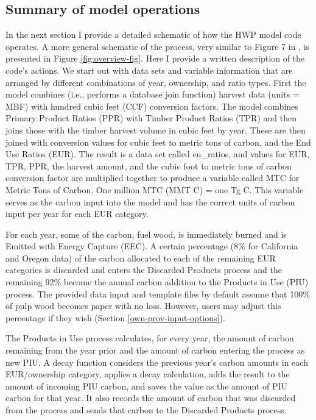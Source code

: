 \documentclass[
  openany]{book}
\begin{document}
\hypertarget{model-func-opp}{%
\subsection{Summary of model operations}\label{model-func-opp}}

In the next section I provide a detailed schematic of how the HWP model code operates. A more general schematic of the process, very similar to Figure 7 in \textcite{stockmann2012}, is presented in Figure \ref{fig:overview-fig}. Here I provide a written description of the code's actions. We start out with data sets and variable information that are arranged by different combinations of year, ownership, and ratio types. First the model combines (i.e., performs a database join function) harvest data (units = MBF) with hundred cubic feet (CCF) conversion factors. The model combines Primary Product Ratios (PPR) with Timber Product Ratios (TPR) and then joins those with the timber harvest volume in cubic feet by year. These are then joined with conversion values for cubic feet to metric tons of carbon, and the End Use Ratios (EUR). The result is a data set called eu\_ratios, and values for EUR, TPR, PPR, the harvest amount, and the cubic foot to metric tons of carbon conversion factor are multiplied together to produce a variable called MTC for Metric Tons of Carbon. One million MTC (MMT C) = one Tg C. This variable serves as the carbon input into the model and has the correct units of carbon input per year for each EUR category.

For each year, some of the carbon, fuel wood, is immediately burned and is Emitted with Energy Capture (EEC). A certain percentage (8\% for California and Oregon data) of the carbon allocated to each of the remaining EUR categories is discarded and enters the Discarded Products process and the remaining 92\% become the annual carbon addition to the Products in Use (PIU) process. The provided data input and template files by default assume that 100\% of pulp wood becomes paper with no loss. However, users may adjust this percentage if they wish (Section \ref{own-prov-input-options}).

The Products in Use process calculates, for every year, the amount of carbon remaining from the year prior and the amount of carbon entering the process as new PIU. A decay function considers the previous year's carbon amounts in each EUR/ownership category, applies a decay calculation, adds the result to the amount of incoming PIU carbon, and saves the value as the amount of PIU carbon for that year. It also records the amount of carbon that was discarded from the process and sends that carbon to the Discarded Products process.
\end{document}
